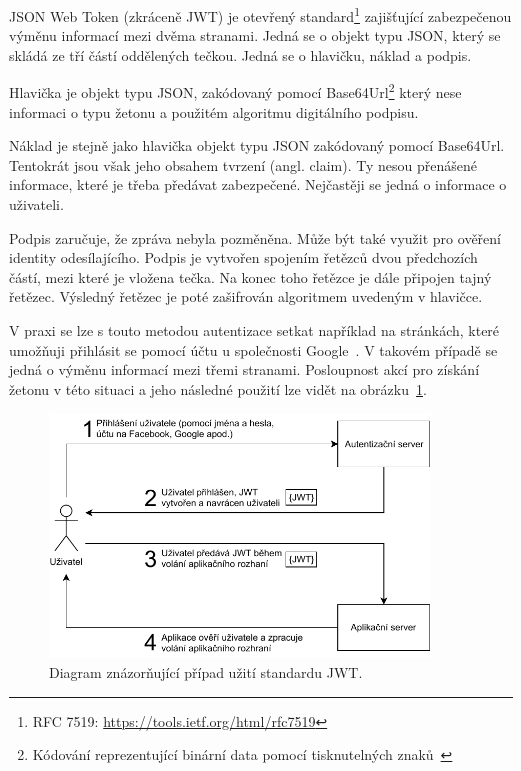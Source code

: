 JSON Web Token (zkráceně JWT) je otevřený standard\footnote{RFC 7519: \url{https://tools.ietf.org/html/rfc7519}} zajišťující zabezpečenou výměnu informací mezi dvěma stranami. Jedná se o objekt typu JSON, který se skládá ze tří částí oddělených tečkou. Jedná se o hlavičku, náklad a podpis.

Hlavička je objekt typu JSON, zakódovaný pomocí Base64Url\footnote{Kódování reprezentující binární data pomocí tisknutelných znaků~\cite{bib:base64}} který nese informaci o typu žetonu a použitém algoritmu digitálního podpisu. 

Náklad je stejně jako hlavička objekt typu JSON zakódovaný pomocí Base64Url. Tentokrát jsou však jeho obsahem tvrzení (angl. claim). Ty nesou přenášené informace, které je třeba předávat zabezpečené. Nejčastěji se jedná o informace o uživateli.

Podpis zaručuje, že zpráva nebyla pozměněna. Může být také využit pro ověření identity odesílajícího. Podpis je vytvořen spojením řetězců dvou předchozích částí, mezi které je vložena tečka. Na konec toho řetězce je dále připojen tajný řetězec. Výsledný řetězec je poté zašifrován algoritmem uvedeným v hlavičce. 

V praxi se lze s touto metodou autentizace setkat například na stránkách, které umožňuji přihlásit se pomocí účtu u společnosti Google~\cite{bib:google-jwt}. V takovém případě se jedná o výměnu informací mezi třemi stranami. Posloupnost akcí pro získání žetonu v této situaci a jeho následné použití lze vidět na obrázku~\ref{img:jwt}.

\begin{figure}[H]
    \label{img:jwt}
	\centering
	\includegraphics[width=0.9\textwidth]{obrazky-figures/jwt.pdf}
	\caption{Diagram znázorňující případ užití standardu JWT.}
\end{figure}

